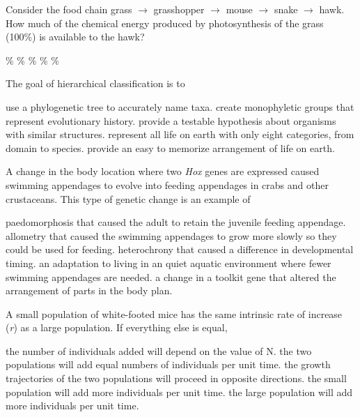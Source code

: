 \question
Consider the food chain grass $\to$ grasshopper $\to$ mouse $\to$ snake $\to$ hawk. How much of the chemical energy produced by photosynthesis of the grass (100\%) is available to the hawk?

\begin{choices}
\%
\%
\%
\%
\%
\end{choices}

\question
The goal of hierarchical classification is to

\begin{choices}
\choice use a phylogenetic tree to accurately name taxa. 
\correctchoice create monophyletic groups that represent evolutionary history. 
\choice provide a testable hypothesis about organisms with similar structures. 
\choice represent all life on earth with only eight categories, from domain to species. 
\choice provide an easy to memorize arrangement of life on earth. 
\end{choices}

\question
A change in the body location where two \textit{Hox} genes are expressed caused swimming appendages to evolve into feeding appendages in crabs and other crustaceans. This type of genetic change is an example of

\begin{choices}
\choice paedomorphosis that caused the adult to retain the juvenile feeding appendage. 
\choice allometry that caused the swimming appendages to grow more slowly so they could be used for feeding. 
\choice heterochrony that caused a difference in developmental timing. 
\choice an adaptation to living in an quiet aquatic environment where fewer swimming appendages are needed. 
\correctchoice a change in a toolkit gene that altered the arrangement of parts in the body plan. 
\end{choices}

\question
A small population of white-footed mice has the same intrinsic rate of increase (\textit{r}) as a large population.  If everything else is equal, 

\begin{choices}
\choice the number of individuals added will depend on the value of N. 
\choice the two populations will add equal numbers of individuals per unit time.
\choice the growth trajectories of the two populations will proceed in opposite directions. 
\choice the small population will add more individuals per unit time. 
\correctchoice the large population will add more individuals per unit time.  
\end{choices}

